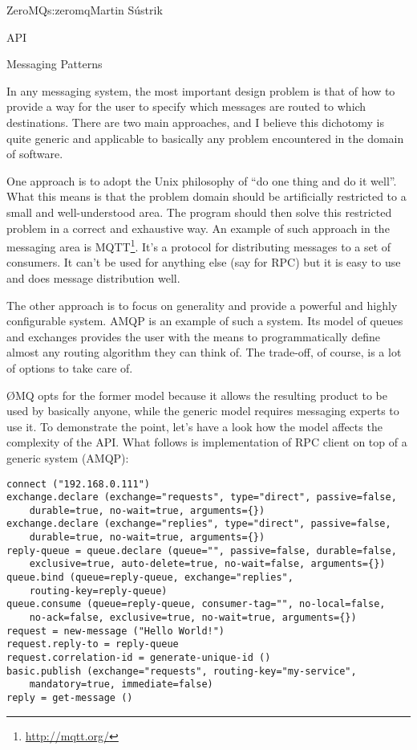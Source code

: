 \begin{aosachapter}{ZeroMQ}{s:zeromq}{Martin S\'{u}strik}
\begin{aosasect1}{API}
\end{aosasect1}

\begin{aosasect1}{Messaging Patterns}

In any messaging system, the most important design problem is that of how to
provide a way for the user to specify which messages are routed to
which destinations.  There are two main approaches, and I believe this
dichotomy is quite generic and applicable to basically any problem
encountered in the domain of software.

One approach is to adopt the Unix
philosophy
of ``do one thing and do it well''. What this means is that the problem
domain should be artificially restricted to a small and well-understood 
area. The program should then solve this restricted problem
in a correct and exhaustive way. An example of such approach in
the messaging area is MQTT\footnote{\url{http://mqtt.org/}}. It's a
protocol for distributing messages to a set of consumers. It can't be
used for anything else (say for RPC) but it is easy to use and does
message distribution well.

The other approach is to focus on generality and provide a powerful
and highly configurable system. AMQP is an example of such a
system. Its model of queues and exchanges provides the user with the
means to programmatically define almost any routing algorithm they can
think of. The trade-off, of course, is a lot of options to take care
of.

{\O}MQ opts for the former model because it allows the resulting
product to be used by basically anyone, while the generic model
requires messaging experts to use it. To demonstrate the point, let's
have a look how the model affects the complexity of the API. What
follows is implementation of RPC client on top of a generic system
(AMQP):

\begin{verbatim}
connect ("192.168.0.111")
exchange.declare (exchange="requests", type="direct", passive=false,
    durable=true, no-wait=true, arguments={})
exchange.declare (exchange="replies", type="direct", passive=false,
    durable=true, no-wait=true, arguments={})
reply-queue = queue.declare (queue="", passive=false, durable=false,
    exclusive=true, auto-delete=true, no-wait=false, arguments={})
queue.bind (queue=reply-queue, exchange="replies",
    routing-key=reply-queue)
queue.consume (queue=reply-queue, consumer-tag="", no-local=false,
    no-ack=false, exclusive=true, no-wait=true, arguments={})
request = new-message ("Hello World!")
request.reply-to = reply-queue
request.correlation-id = generate-unique-id ()
basic.publish (exchange="requests", routing-key="my-service",
    mandatory=true, immediate=false)
reply = get-message ()
\end{verbatim}


\end{aosasect1}
\end{aosachapter}
